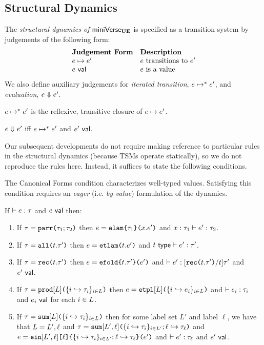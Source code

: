 \subsection{Structural Dynamics}\label{sec:dynamics-U}
The \emph{structural dynamics of }$\mathsf{miniVerse}_\textbf{UE}$ is specified as a transition system by judgements of the following form:
\[\begin{array}{ll}
\textbf{Judgement Form} & \textbf{Description}\\
e \mapsto e' & \text{$e$ transitions to $e'$}\\
e~\mathsf{val} & \text{$e$ is a value}
\end{array}\]
We also define auxiliary judgements for \emph{iterated transition}, $e \mapsto^{*} e'$, and \emph{evaluation}, $e \Downarrow e'$.

\begin{definition}\label{defn:iterated-transition-U} $e \mapsto^{*} e'$ is the reflexive, transitive closure of $e \mapsto e'$.\end{definition}

\begin{definition}[Evaluation]\label{defn:evaluation-U}  $e \Downarrow e'$ iff $e \mapsto^{*} e'$ and $e'~\mathsf{val}$. \end{definition}

Our subsequent developments do not require making reference to particular rules in the structural dynamics (because TSMs operate statically), so we do not reproduce the rules here. Instead, it suffices to state the following conditions.

The Canonical Forms condition characterizes well-typed values. Satisfying this condition requires an \emph{eager} (i.e. \emph{by-value}) formulation of the dynamics. 
\begin{condition}\label{condition:canonical-forms-U} If $\vdash e : \tau$ and $e~\mathsf{val}$ then:
\begin{enumerate}
\item If $\tau=\texttt{parr}\texttt{(}\tau_1; \tau_2\texttt{)}$ then $e=\texttt{elam}\texttt{\{}\tau_1\texttt{\}(}x.e'\texttt{)}$ and $x : \tau_1 \vdash e' : \tau_2$.
\item If $\tau=\texttt{all}\texttt{(}t.\tau'\texttt{)}$ then $e=\texttt{etlam}\texttt{(}t.e'\texttt{)}$ and $t~\mathsf{type} \vdash e' : \tau'$.
\item If $\tau=\texttt{rec}\texttt{(}t.\tau'\texttt{)}$ then $e=\texttt{efold}\texttt{\{}t.\tau'\texttt{\}(}e'\texttt{)}$ and $\vdash e' : [\texttt{rec}\texttt{(}t.\tau'\texttt{)}/t]\tau'$ and $e'~\mathsf{val}$. 
\item If $\tau=\texttt{prod}[L]\texttt{(}\{i \hookrightarrow \tau_{i}\}_{i \in L}\texttt{)}$ then $e=\texttt{etpl}[L]\texttt{(}\{i \hookrightarrow e_{i}\}_{i \in L}\texttt{)}$ and $\vdash e_i : \tau_i$ and $e_i~\mathsf{val}$ for each $i \in L$.
\item If $\tau=\texttt{sum}[L]\texttt{(}\{i \hookrightarrow \tau_{i}\}_{i \in L}\texttt{)}$ then for some label set $L'$ and label $\ell$, we have that $L=L', \ell$ and $\tau=\texttt{sum}[L', \ell]\texttt{(}\{i \hookrightarrow \tau_{i}\}_{i \in L'}; \ell \hookrightarrow \tau_\ell\texttt{)}$ and $e=\texttt{ein}[L', \ell]\texttt{[}\ell\texttt{]\{}\{i \hookrightarrow \tau_{i}\}_{i \in L'}; \ell \hookrightarrow \tau_\ell\texttt{\}(}e'\texttt{)}$ and $\vdash e' : \tau_\ell$ and $e'~\mathsf{val}$.
\end{enumerate}\end{condition}

